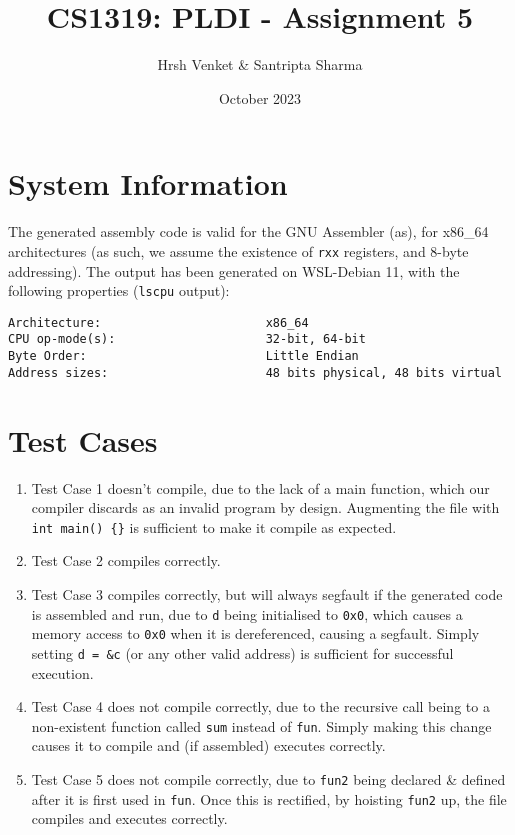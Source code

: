 \documentclass{article}
\title{CS1319: PLDI - Assignment 5}
\author{Hrsh Venket \& Santripta Sharma}
\date{October 2023}
\begin{document}
\maketitle 

\section{System Information}
The generated assembly code is valid for the GNU Assembler (as), for x86\_64 architectures (as such, we assume the existence of \verb|rxx| registers, and 8-byte addressing). The output has been generated on WSL-Debian 11, with the following properties (\verb|lscpu| output):
\begin{verbatim}
Architecture:                       x86_64
CPU op-mode(s):                     32-bit, 64-bit
Byte Order:                         Little Endian
Address sizes:                      48 bits physical, 48 bits virtual
\end{verbatim}

\section{Test Cases}
\begin{enumerate}
	\item Test Case 1 doesn't compile, due to the lack of a main function, which our compiler discards as an invalid program by design. Augmenting the file with \verb|int main() {}| is sufficient to make it compile as expected.
	\item Test Case 2 compiles correctly.
	\item Test Case 3 compiles correctly, but will always segfault if the generated code is assembled and run, due to \verb|d| being initialised to \verb|0x0|, which causes a memory access to \verb|0x0| when it is dereferenced, causing a segfault. Simply setting \verb|d = &c| (or any other valid address) is sufficient for successful execution.
	\item Test Case 4 does not compile correctly, due to the recursive call being to a non-existent function called \verb|sum| instead of \verb|fun|. Simply making this change causes it to compile and (if assembled) executes correctly.
	\item Test Case 5 does not compile correctly, due to \verb|fun2| being declared \& defined after it is first used in \verb|fun|. Once this is rectified, by hoisting \verb|fun2| up, the file compiles and executes correctly.
\end{enumerate}
\end{document}
